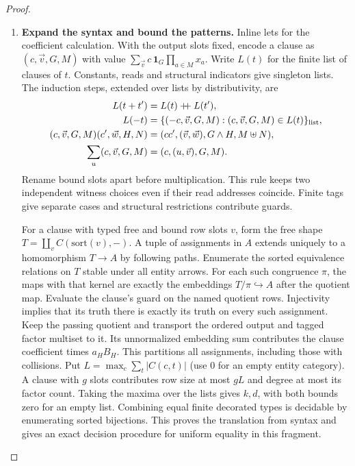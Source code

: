 \documentclass[11pt,a4paper]{article}
\theoremstyle{definition}
\theoremstyle{remark}\newaliascnt{remark}{theorem}
\numberwithin{equation}{section}
\begin{document}
\begin{proof}
\begin{enumerate}[titledsteps]
    \item \textbf{Expand the syntax and bound the patterns.} Inline lets for the coefficient calculation. With the output slots fixed, encode a clause as \((c,\vec v,G,M)\) with value \(\sum_{\vec v} c\,\mathbf1_G\prod_{a\in M}x_a\). Write \(L(t)\) for the finite list of clauses of \(t\). Constants, reads and structural indicators give singleton lists. The induction steps, extended over lists by distributivity, are
\[
\begin{aligned}
 L(t+t')&=L(t)\mathbin{+\!\!+}L(t'),\\
 L(-t)&=\{(-c,\vec v,G,M):(c,\vec v,G,M)\in L(t)\}_{\rm list},\\
 (c,\vec v,G,M)(c',\vec w,H,N)
   &=(cc',(\vec v,\vec w),G\wedge H,M\uplus N),\\
 \sum_{u}(c,\vec v,G,M)&=(c,(u,\vec v),G,M).
\end{aligned}
\]
Rename bound slots apart before multiplication. This rule keeps two independent witness choices even if their read addresses coincide. Finite tags give separate cases and structural restrictions contribute guards.

For a clause with typed free and bound row slots $v$, form the free shape $T=\coprod_v C(\mathrm{sort}(v),-)$. A tuple of assignments in $A$ extends uniquely to a homomorphism $T\to A$ by following paths. Enumerate the sorted equivalence relations on $T$ stable under all entity arrows. For each such congruence $\pi$, the maps with that kernel are exactly the embeddings $T/\pi\hookrightarrow A$ after the quotient map. Evaluate the clause's guard on the named quotient rows. Injectivity implies that its truth there is exactly its truth on every such assignment. Keep the passing quotient and transport the ordered output and tagged factor multiset to it. Its unnormalized embedding sum contributes the clause coefficient times $a_H B_H$. This partitions all assignments, including those with collisions. Put $L=\max_c\sum_t|C(c,t)|$ (use $0$ for an empty entity category). A clause with $g$ slots contributes row size at most $gL$ and degree at most its factor count. Taking the maxima over the lists gives $k,d$, with both bounds zero for an empty list. Combining equal finite decorated types is decidable by enumerating sorted bijections. This proves the translation from syntax and gives an exact decision procedure for uniform equality in this fragment.



\end{enumerate}
\end{proof}
\end{document}
